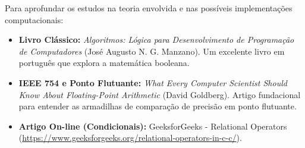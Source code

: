 \documentclass[12pt]{article}
\begin{document}
\vspace{1cm}

\begin{notebox}
Para aprofundar os estudos na teoria envolvida e nas possíveis implementações computacionais:
\begin{itemize}
    \item \textbf{Livro Clássico:} \textit{Algoritmos: Lógica para Desenvolvimento de Programação de Computadores} (José Augusto N. G. Manzano). Um excelente livro em português que explora a matemática booleana.
    \item \textbf{IEEE 754 e Ponto Flutuante:} \textit{What Every Computer Scientist Should Know About Floating-Point Arithmetic} (David Goldberg). Artigo fundacional para entender as armadilhas de comparação de precisão em ponto flutuante.
    \item \textbf{Artigo On-line (Condicionais):} GeeksforGeeks - Relational Operators (\url{https://www.geeksforgeeks.org/relational-operators-in-c-c/}).
\end{itemize}
\end{notebox}

\vfill
\end{document}
